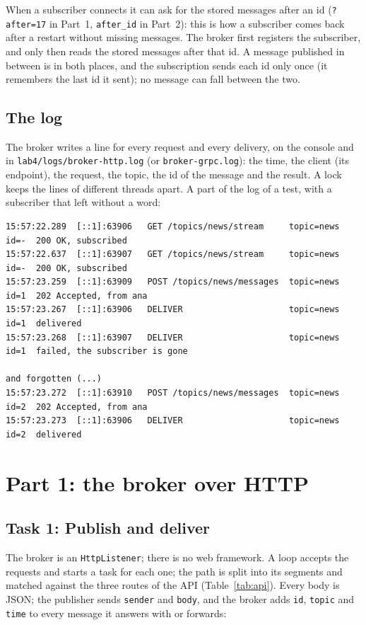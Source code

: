\documentclass[11pt,a4paper]{article}
\newcommand{\code}[1]{{\frenchspacing\texttt{#1}}}
\begin{document}
When a subscriber connects it can ask for the stored messages after an id (\code{?after=17} in
Part~1, \code{after\_id} in Part~2): this is how a subscriber comes back after a restart without
missing messages. The broker first registers the subscriber, and only then reads the stored messages
after that id. A message published in between is in both places, and the subscription sends each id
only once (it remembers the last id it sent); no message can fall between the two.

\subsection{The log}

The broker writes a line for every request and every delivery, on the console and in
\code{lab4/logs/broker-http.log} (or \code{broker-grpc.log}): the time, the client (its endpoint),
the request, the topic, the id of the message and the result. A lock keeps the lines of different
threads apart. A part of the log of a test, with a subscriber that left without a word:

\begin{lstlisting}
15:57:22.289  [::1]:63906   GET /topics/news/stream     topic=news  id=-  200 OK, subscribed
15:57:22.637  [::1]:63907   GET /topics/news/stream     topic=news  id=-  200 OK, subscribed
15:57:23.259  [::1]:63909   POST /topics/news/messages  topic=news  id=1  202 Accepted, from ana
15:57:23.267  [::1]:63906   DELIVER                     topic=news  id=1  delivered
15:57:23.268  [::1]:63907   DELIVER                     topic=news  id=1  failed, the subscriber is gone
                                                                          and forgotten (...)
15:57:23.272  [::1]:63910   POST /topics/news/messages  topic=news  id=2  202 Accepted, from ana
15:57:23.273  [::1]:63906   DELIVER                     topic=news  id=2  delivered
\end{lstlisting}

\section{Part 1: the broker over HTTP}

\subsection{Task 1: Publish and deliver}

The broker is an \code{HttpListener}; there is no web framework. A loop accepts the requests and
starts a task for each one; the path is split into its segments and matched against the three
routes of the API (Table~\ref{tab:api}). Every body is JSON; the publisher sends \code{sender} and
\code{body}, and the broker adds \code{id}, \code{topic} and \code{time} to every message it answers
with or forwards:
\end{document}
